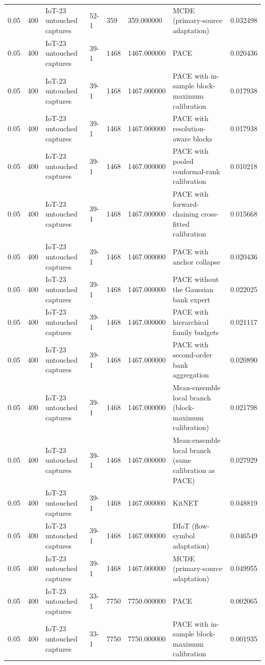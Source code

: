 \begin{tabular}{llllllll}
0.05 & 400 & IoT-23 untouched captures & 52-1 & 359 & 359.000000 & MCDE (primary-source adaptation) & 0.032498 \\
0.05 & 400 & IoT-23 untouched captures & 39-1 & 1468 & 1467.000000 & PACE & 0.020436 \\
0.05 & 400 & IoT-23 untouched captures & 39-1 & 1468 & 1467.000000 & PACE with in-sample block-maximum calibration & 0.017938 \\
0.05 & 400 & IoT-23 untouched captures & 39-1 & 1468 & 1467.000000 & PACE with resolution-aware blocks & 0.017938 \\
0.05 & 400 & IoT-23 untouched captures & 39-1 & 1468 & 1467.000000 & PACE with pooled conformal-rank calibration & 0.010218 \\
0.05 & 400 & IoT-23 untouched captures & 39-1 & 1468 & 1467.000000 & PACE with forward-chaining cross-fitted calibration & 0.015668 \\
0.05 & 400 & IoT-23 untouched captures & 39-1 & 1468 & 1467.000000 & PACE with anchor collapse & 0.020436 \\
0.05 & 400 & IoT-23 untouched captures & 39-1 & 1468 & 1467.000000 & PACE without the Gaussian bank expert & 0.022025 \\
0.05 & 400 & IoT-23 untouched captures & 39-1 & 1468 & 1467.000000 & PACE with hierarchical family budgets & 0.021117 \\
0.05 & 400 & IoT-23 untouched captures & 39-1 & 1468 & 1467.000000 & PACE with second-order bank aggregation & 0.020890 \\
0.05 & 400 & IoT-23 untouched captures & 39-1 & 1468 & 1467.000000 & Mean-ensemble local branch (block-maximum calibration) & 0.021798 \\
0.05 & 400 & IoT-23 untouched captures & 39-1 & 1468 & 1467.000000 & Mean-ensemble local branch (same calibration as PACE) & 0.027929 \\
0.05 & 400 & IoT-23 untouched captures & 39-1 & 1468 & 1467.000000 & KitNET & 0.048819 \\
0.05 & 400 & IoT-23 untouched captures & 39-1 & 1468 & 1467.000000 & DIoT (flow-symbol adaptation) & 0.046549 \\
0.05 & 400 & IoT-23 untouched captures & 39-1 & 1468 & 1467.000000 & MCDE (primary-source adaptation) & 0.049955 \\
0.05 & 400 & IoT-23 untouched captures & 33-1 & 7750 & 7750.000000 & PACE & 0.002065 \\
0.05 & 400 & IoT-23 untouched captures & 33-1 & 7750 & 7750.000000 & PACE with in-sample block-maximum calibration & 0.001935 \\

\end{tabular}
